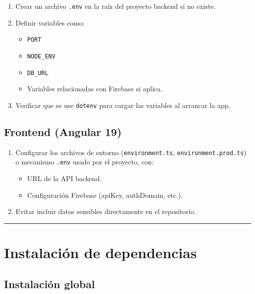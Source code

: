 \documentclass[
  spanish,
  11pt,
]{report}
\providecommand{\tightlist}{%
  \setlength{\itemsep}{0pt}\setlength{\parskip}{0pt}}
\begin{document}
\begin{enumerate}
\def\labelenumi{\arabic{enumi}.}
\tightlist
\item
  Crear un archivo \texttt{.env} en la raíz del proyecto backend si no
  existe.
\item
  Definir variables como:

  \begin{itemize}
  \tightlist
  \item
    \texttt{PORT}
  \item
    \texttt{NODE\_ENV}
  \item
    \texttt{DB\_URL}
  \item
    Variables relacionadas con Firebase si aplica.
  \end{itemize}
\item
  Verificar que se use \texttt{dotenv} para cargar las variables al
  arrancar la app.
\end{enumerate}

\subsection{Frontend (Angular 19)}\label{frontend-angular-19}

\begin{enumerate}
\def\labelenumi{\arabic{enumi}.}
\tightlist
\item
  Configurar los archivos de entorno (\texttt{environment.ts},
  \texttt{environment.prod.ts}) o mecanismo \texttt{.env} usado por el
  proyecto, con:

  \begin{itemize}
  \tightlist
  \item
    URL de la API backend.
  \item
    Configuración Firebase (apiKey, authDomain, etc.).
  \end{itemize}
\item
  Evitar incluir datos sensibles directamente en el repositorio.
\end{enumerate}

\begin{center}\rule{0.5\linewidth}{0.5pt}\end{center}

\section{Instalación de
dependencias}\label{instalaciuxf3n-de-dependencias}

\subsection{Instalación global}\label{instalaciuxf3n-global}
\end{document}
